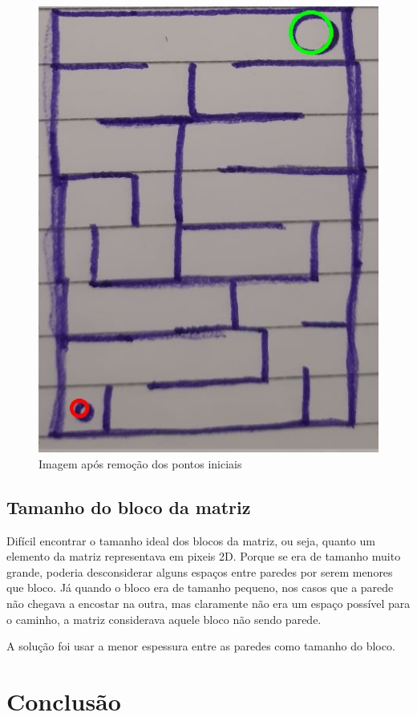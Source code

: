 \documentclass[conference]{IEEEtran}
\begin{document}
     \begin{figure}[h!]
          \centering
            \includegraphics[scale=0.3]{edgeImageWithoutCirclesmedium.jpg}
            \caption{Imagem após remoção dos pontos iniciais}
        \end{figure}

    \subsection{Tamanho do bloco da matriz}
    Difícil encontrar o tamanho ideal dos blocos da matriz, ou seja, quanto um elemento da matriz representava em pixeis 2D. Porque se era de tamanho muito grande, poderia desconsiderar alguns espaços entre paredes por serem menores que bloco. Já quando o bloco era de tamanho pequeno, nos casos que a parede não chegava a encostar na outra, mas claramente não era um espaço possível para o caminho, a matriz considerava aquele bloco não sendo parede.

    A solução foi usar a menor espessura entre as paredes como tamanho do bloco.

\section*{Conclusão}
\end{document}
